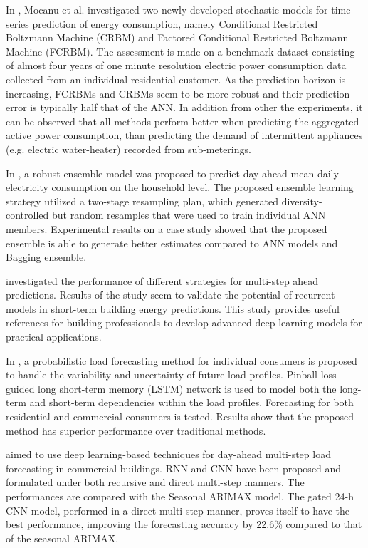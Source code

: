 In \cite{MOCANU201691}, Mocanu et al. investigated two newly developed stochastic models for time series prediction of energy consumption, namely Conditional Restricted Boltzmann Machine (CRBM) and Factored Conditional Restricted Boltzmann Machine (FCRBM).
The assessment is made on a benchmark dataset consisting of almost four years of one minute resolution electric power consumption data collected from an individual residential customer.
As the prediction horizon is increasing, FCRBMs and CRBMs seem to be more robust and their prediction error is typically half that of the ANN.
In addition from other the experiments, it can be observed that all methods perform better when predicting the aggregated active power consumption, than predicting the demand of intermittent appliances (e.g. electric water-heater) recorded from sub-meterings.

In \cite{ALOBAIDI2018997}, a robust ensemble model was proposed to predict day-ahead mean daily electricity consumption on the household level.
The proposed ensemble learning strategy utilized a two-stage resampling plan, which generated diversity-controlled but random resamples that were used to train individual ANN members.
Experimental results on a case study showed that the proposed ensemble is able to generate better estimates compared to ANN models and Bagging ensemble.

\cite{FAN2019700} investigated the performance of different strategies for multi-step ahead predictions.
Results of the study seem to validate the potential of recurrent models in short-term building energy predictions.
This study provides useful references for building professionals to develop advanced deep learning models for practical applications.

In \cite{WANG201910}, a probabilistic load forecasting method for individual consumers is proposed to handle the variability and uncertainty of future load profiles.
Pinball loss guided long short-term memory (LSTM) network is used to model both the long-term and short-term dependencies within the load profiles.
Forecasting for both residential and commercial consumers is tested.
Results show that the proposed method has superior performance over traditional methods.

\cite{CAI20191078} aimed to use deep learning-based techniques for day-ahead multi-step load forecasting in commercial buildings.
RNN and CNN have been proposed and formulated under both recursive and direct multi-step manners.
The performances are compared with the Seasonal ARIMAX model.
The gated 24-h CNN model, performed in a direct multi-step manner, proves itself to have the best performance, improving the forecasting accuracy by 22.6\% compared to that of the seasonal ARIMAX.

